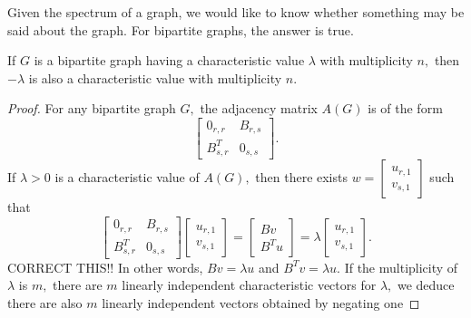 Given the spectrum of a graph, we would like to know whether something
may be said about the graph. For bipartite graphs, the answer is true.

\begin{theorem}
	If $G$ is a bipartite graph having a characteristic value 
	$\lambda$ with multiplicity $n,$ then $-\lambda$ is also
	a characteristic value with multiplicity $n.$
\end{theorem}
\begin{proof}
	For any bipartite graph $G,$ the adjacency matrix $A(G)$
	is of the form
	$$\begin{bmatrix}
		0_{r,r} & B _{r,s} \\ B^T_{s,r} & 0_{s,s} 
	\end{bmatrix}.$$
	If $\lambda > 0$ is a characteristic value of $A(G),$ then there
	exists $w = \begin{bmatrix} u _{r,1} \\ v_{s,1} \end{bmatrix}$
	such that
	$$\begin{bmatrix}
		0_{r,r} & B _{r,s} \\ B^T_{s,r} & 0_{s,s} 
	\end{bmatrix}
	\begin{bmatrix} u _{r,1} \\ v_{s,1} \end{bmatrix}
	=\begin{bmatrix}
		B v \\ B^T u
	\end{bmatrix}
	 =  \lambda \begin{bmatrix} u _{r,1} \\ v_{s,1} \end{bmatrix}.$$
	 CORRECT THIS!!
	 In other words, $B v = \lambda u$ and $B^T v = \lambda u.$
	 If the multiplicity of $\lambda$ is $m,$ there are 
	 $m$ linearly independent characteristic vectors for $\lambda,$
	 we deduce there are also $m$ linearly independent vectors 
	 obtained by negating one 
\end{proof}
